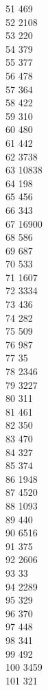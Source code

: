 { 51	469 \\
 52	2108 \\
 53	220 \\
 54	379 \\
 55	377 \\
 56	478 \\
 57	364 \\
 58	422 \\
 59	310 \\
 60	480 \\
 61	442 \\
 62	3738 \\
 63	10838 \\
 64	198 \\
 65	456 \\
 66	343 \\
 67	16900 \\
 68	586 \\
 69	687 \\
 70	533 \\
 71	1607 \\
 72	3334 \\
 73	436 \\
 74	282 \\
 75	509 \\
 76	987 \\
 77	35 \\
 78	2346 \\
 79	3227 \\
 80	311 \\
 81	461 \\
 82	350 \\
 83	470 \\
 84	327 \\
 85	374 \\
 86	1948 \\
 87	4520 \\
 88	1093 \\
 89	440 \\
 90	6516 \\
 91	375 \\
 92	2606 \\
 93	33 \\
 94	2289 \\
 95	329 \\
 96	370 \\
 97	448 \\
 98	341 \\
 99	492 \\
 100	3459 \\
 101	321 \\
}
